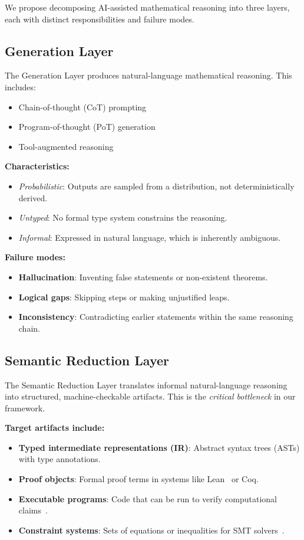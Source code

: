 \documentclass[11pt,a4paper]{article}
\begin{document}
We propose decomposing AI-assisted mathematical reasoning into three layers, each with distinct responsibilities and failure modes.

\subsection{Generation Layer}

The Generation Layer produces natural-language mathematical reasoning. This includes:
\begin{itemize}
  \item Chain-of-thought (CoT) prompting~\cite{wei2022chain}
  \item Program-of-thought (PoT) generation~\cite{gao2023pal}
  \item Tool-augmented reasoning~\cite{schick2023toolformer}
\end{itemize}

\textbf{Characteristics:}
\begin{itemize}
  \item \emph{Probabilistic}: Outputs are sampled from a distribution, not deterministically derived.
  \item \emph{Untyped}: No formal type system constrains the reasoning.
  \item \emph{Informal}: Expressed in natural language, which is inherently ambiguous.
\end{itemize}

\textbf{Failure modes:}
\begin{itemize}
  \item \textbf{Hallucination}: Inventing false statements or non-existent theorems.
  \item \textbf{Logical gaps}: Skipping steps or making unjustified leaps.
  \item \textbf{Inconsistency}: Contradicting earlier statements within the same reasoning chain.
\end{itemize}

\subsection{Semantic Reduction Layer}

The Semantic Reduction Layer translates informal natural-language reasoning into structured, machine-checkable artifacts. This is the \emph{critical bottleneck} in our framework.

\textbf{Target artifacts include:}
\begin{itemize}
  \item \textbf{Typed intermediate representations (IR)}: Abstract syntax trees (ASTs) with type annotations.
  \item \textbf{Proof objects}: Formal proof terms in systems like Lean~\cite{avigad2014lean} or Coq.
  \item \textbf{Executable programs}: Code that can be run to verify computational claims~\cite{gao2023pal}.
  \item \textbf{Constraint systems}: Sets of equations or inequalities for SMT solvers~\cite{de2008z3}.
\end{itemize}
\end{document}
